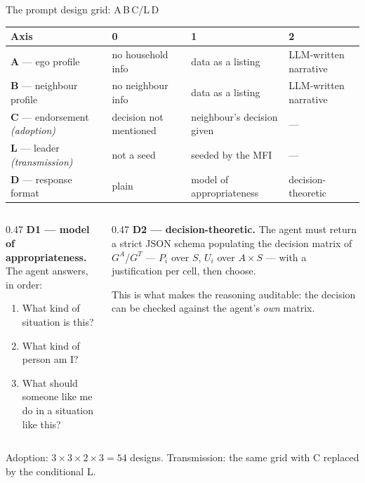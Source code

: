 \documentclass[aspectratio=169,10pt]{beamer}
\newcommand{\hl}[1]{\textcolor{mLightBrown}{#1}}
\newcommand{\srcnote}[1]{{\tiny\color{gray}#1}}
\begin{document}
\begin{frame}{The prompt design grid: A\,B\,C/L\,D}
  \centering\scriptsize
  \begin{tabular}{@{}llll@{}}
    \toprule
    \textbf{Axis} & \textbf{0} & \textbf{1} & \textbf{2} \\
    \midrule
    \textbf{A} --- ego profile     & no household info      & data as a listing        & LLM-written narrative \\
    \textbf{B} --- neighbour profile & no neighbour info    & data as a listing        & LLM-written narrative \\
    \textbf{C} --- endorsement \emph{(adoption)}   & decision not mentioned & neighbour's decision given & --- \\
    \textbf{L} --- leader \emph{(transmission)}    & not a seed             & seeded by the MFI          & --- \\
    \textbf{D} --- response format & plain                  & model of appropriateness & decision-theoretic \\
    \bottomrule
  \end{tabular}

  \vfill
  \begin{columns}[T,onlytextwidth]
    \begin{column}{0.47\textwidth}
      \scriptsize
      \textbf{D1 --- model of appropriateness.} The agent answers, in order:
      \begin{enumerate}\scriptsize
        \item What kind of situation is this?
        \item What kind of person am I?
        \item What should someone like me do in a situation like this?
      \end{enumerate}
    \end{column}
    \begin{column}{0.47\textwidth}
      \scriptsize
      \textbf{D2 --- decision-theoretic.} The agent must return a strict JSON
      schema populating the decision matrix of $G^A$/$G^T$ --- $P_i$ over $S$,
      $U_i$ over $A\times S$ --- \hl{with a justification per cell}, then choose.
      \smallskip

      \srcnote{This is what makes the reasoning auditable: the decision can be
        checked against the agent's \emph{own} matrix.}
    \end{column}
  \end{columns}
  \vfill
  \srcnote{Adoption: $3\times3\times2\times3 = 54$ designs. Transmission: the
    same grid with C replaced by the conditional L.}
\end{frame}
\end{document}
